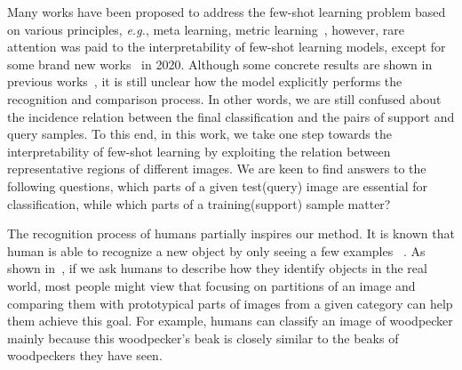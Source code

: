 \documentclass[letterpaper]{article}
\begin{document}
Many works have been proposed to address the few-shot learning problem based on various principles, \emph{e.g.}, meta learning, metric learning~\cite{snell2017prototypical,VinyalsMatching,sung2018learning}, however, rare attention was paid to the interpretability of few-shot learning models, except for some brand new works~\cite{Explanation-Guided,cao2020concept} in 2020. Although some concrete results are shown in previous works~\cite{satorras2018few,santoro2016meta}, it is still unclear how the model explicitly performs the recognition and comparison process. In other words, we are still confused about the incidence relation between the final classification and the pairs of support and query samples. To this end, in this work, we take one step towards the interpretability of few-shot learning by exploiting the relation between representative regions of different images. We are keen to find answers to the following questions, which parts of a given test(query) image are essential for classification, while which parts of a training(support) sample matter? 

The recognition process of humans partially inspires our method. It is known that human is able to recognize a new object by only seeing a few examples ~\cite{lake2011one,gidaris2018dynamic,qi2018low}. As shown in~\cite{Chen2018ThisLL,sung2018learning}, if we ask humans to describe how they identify objects in the real world, most people might view that focusing on partitions of an image and comparing them with prototypical parts of images from a given category can help them achieve this goal. For example, humans can classify an image of woodpecker mainly because this woodpecker's beak is closely similar to the beaks of woodpeckers they have seen.  
\end{document}
